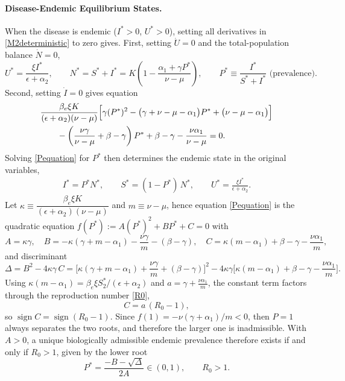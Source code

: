 \documentclass[12pt,a4paper,reqno]{amsart}
\theoremstyle{definition}
\theoremstyle{remark}
\theoremstyle{plain}
\begin{document}
\paragraph{\textbf{Disease-Endemic Equilibrium States.}}

When the disease is endemic ($I^{*}>0$, $U^{*}>0$), setting all derivatives in \eqref{M2deterministic} to zero gives. First, setting $\dot U=0$ and the total-population balance $\dot N=0$,
$$
U^{*}=\frac{\xi I^{*}}{\epsilon+\alpha_2},
\qquad
N^{*}=S^{*}+I^{*}=K\left(1-\frac{\alpha_1+\gamma P^{*}}{\nu-\mu}\right),
\qquad P^{*}\equiv\frac{I^{*}}{S^{*}+I^{*}} \text{ (prevalence)}.
$$
Second, setting $\dot I=0$ gives
equation
\begin{equation}\label{Pequation}
\begin{aligned}
&\frac{\beta_e \xi K}{(\epsilon+\alpha_2)(\nu-\mu)}
\Bigl[\gamma (P^{*})^{2}-\bigl(\gamma+\nu-\mu-\alpha_1\bigr)P^{*}+\bigl(\nu-\mu-\alpha_1\bigr)\Bigr]\\
&\qquad-\left(\frac{\nu\gamma}{\nu-\mu}+\beta-\gamma\right)P^{*}+\beta-\gamma-\frac{\nu\alpha_1}{\nu-\mu}=0.
\end{aligned}
\end{equation}
Solving \eqref{Pequation} for $P^{*}$ then determines the endemic state in the original variables,
\begin{equation}\label{NUequation}
\begin{aligned}
I^{*}=P^{*}N^{*},\qquad S^{*}=(1-P^{*})\,N^{*},\qquad U^{*}=\frac{\xi I^{*}}{\epsilon+\alpha_2}.
\end{aligned}
\end{equation}
Let $\kappa\equiv\dfrac{\beta_e\xi K}{(\epsilon+\alpha_2)(\nu-\mu)}$ and $m\equiv\nu-\mu$, hence equation \eqref{Pequation} is the quadratic equation $f(P^{*}):=A(P^{*})^{2}+BP^{*}+C=0$ with
$$
A=\kappa\gamma,\quad
B=-\kappa(\gamma+m-\alpha_1)-\frac{\nu\gamma}{m}-(\beta-\gamma),\quad
C=\kappa(m-\alpha_1)+\beta-\gamma-\frac{\nu\alpha_1}{m},
$$
and discriminant
$$
\Delta=B^{2}-4\kappa\gamma\,C
=\Big[\kappa(\gamma+m-\alpha_1)+\frac{\nu\gamma}{m}+(\beta-\gamma)\Big]^{2}
-4\kappa\gamma\Big[\kappa(m-\alpha_1)+\beta-\gamma-\frac{\nu\alpha_1}{m}\Big].
$$
Using $\kappa(m-\alpha_1)=\beta_e\xi S_2^{*}/(\epsilon+\alpha_2)$ and $a=\gamma+\frac{\nu\alpha_1}{m}$, the constant term factors through the reproduction number \eqref{R0},
$$
C=a\,(R_0-1),
$$
so $\operatorname{sign}C=\operatorname{sign}(R_0-1)$. Since $f(1)=-\nu(\gamma+\alpha_1)/m<0$, then $P=1$ always separates the two roots, and therefore the larger one is inadmissible. With $A>0$, a unique biologically admissible endemic prevalence therefore exists if and only if $R_0>1$, given by the lower root
$$
P^{*}=\frac{-B-\sqrt{\Delta}}{2A}\in(0,1),\qquad R_0>1 .
$$
\end{document}
